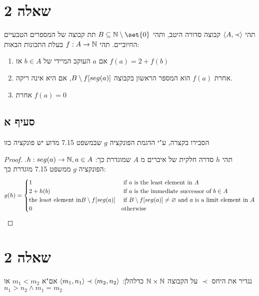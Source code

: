 \documentclass{article}
\DeclarePairedDelimiter\set\{\}
\begin{document}
    \section*{שאלה 2}
    תהי $\langle A, \prec \rangle$ קבוצה סדורה היטב, ותהי $B \subseteq \NN \sub \set{0}$ תת קבוצה של המספרים הטבעיים החיוביים.
    תהי $f: A \rightarrow \mathbb{N}$ בעלת התכונות הבאות:
    \begin{enumerate}
        \item אם $a$ העוקב המיידי של $b \in A$ אז $f(a) = 2 + f(b)$
        \item אחרת $f(a)$ הוא המספר הראשון בקבוצה $B \setminus f[seg(a)]$, אם היא אינה ריקה.
        \item אחרת $f(a) = 0$
    \end{enumerate}

    \subsection*{סעיף א}
    הסבירו בקצרה, ע"י הדגמת הפונקציה $g$ שבמשפט 7.15 מדוע יש פונקציה כזו
    \begin{proof}
        תהי $h$ סדרה חלקית של איברים מ $A$ שמוגדרת כך: $h: seg(a) \rightarrow \mathbb{N}, a \in A$.
        הפונקציה $g$ ממשפט 7.15 מוגדרת כך:
        \begin{align*}
            g(h) =
            \begin{cases}
                1 &\text{ if $a$ is the least element in $A$} \\
                2 + h(b) &\text{ if $a$ is the immediate successor of $b \in A$} \\
                \text{the least element in} B \setminus f[seg(a)] &\text{ if $B \setminus f[seg(a)] \neq \varnothing$ and $a$ is a limit element in $A$} \\
                0 &\text{otherwise}
            \end{cases}
        \end{align*}
    \end{proof}





	\section*{שאלה 2}
	נגדיר את היחס $\prec$ על הקבוצה $\mathbb{N} \times \mathbb{N}$ כדלהלן:
	$\langle m_1, n_1 \rangle \prec \langle m_2, n_2 \rangle$ אם"א $m_1 < m_2$ או $n_1 > n_2 \land m_1 = m_2$
\end{document}
